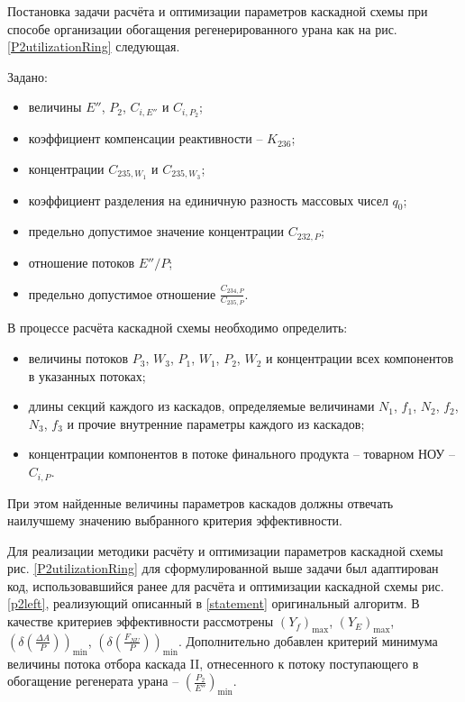 Постановка задачи расчёта и оптимизации параметров каскадной схемы при способе организации обогащения регенерированного урана как на рис. \ref{P2utilizationRing} следующая.

Задано:

\begin{itemize}
    \item величины $E''$, $P_2$, $C_{i,E''}$ и $C_{i,{P_2}}$; 
    \item коэффициент компенсации реактивности -- $K_{236}$;
    \item концентрации $C_{235,{W_1}}$ и $C_{235,{W_3}}$;
    \item коэффициент разделения на единичную разность массовых чисел $q_{0}$;
    \item предельно допустимое значение концентрации $C_{232,{P}}$;
    \item отношение потоков ${E''}/P$;
    \item предельно допустимое отношение $\frac{C_{234,{P}}}{C_{235,{P}}}$. 
\end{itemize}

В процессе расчёта каскадной схемы необходимо определить:

\begin{itemize}
    \item величины потоков $P_3$, $W_3$, $P_1$, $W_1$, $P_2$, $W_2$ и концентрации всех компонентов в указанных потоках; 
    \item длины секций каждого из каскадов, определяемые величинами $N_1$, $f_1$, $N_2$, $f_2$, $N_3$, $f_3$ и прочие внутренние параметры каждого из каскадов;
    \item концентрации компонентов в потоке финального продукта -- товарном НОУ -- $C_{i,P}$.
\end{itemize}

При этом найденные величины параметров каскадов должны отвечать наилучшему значению выбранного критерия эффективности.  

Для реализации методики расчёту и оптимизации параметров каскадной схемы рис. \ref{P2utilizationRing} для сформулированной выше задачи был адаптирован код, использовавшийся ранее для расчёта и оптимизации каскадной схемы рис. \ref{p2left}, реализующий описанный в \ref{statement} оригинальный алгоритм. В качестве критериев эффективности рассмотрены $(Y_f)_\text{max}$, $(Y_{E})_\text{max}$, $(\delta(\frac{\Delta A}{P}))_\text{min}$, $(\delta(\frac{F_{NU}}{P}))_\text{min}$. Дополнительно добавлен критерий минимума величины потока отбора каскада II, отнесенного к потоку поступающего в обогащение регенерата урана -- $(\frac{P_2}{E''})_\text{min}$.     

